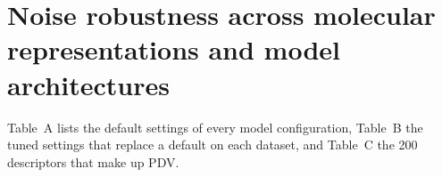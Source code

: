 \section{Noise robustness across molecular representations and model architectures}\label{app:add:robustness}

\label{app:noise:sec:hyperparameters_default}\label{app:noise:sec:hyperparameters_tuned}\label{app:noise:sec:pdv_descriptors}
Table~A lists the default settings of every model configuration, Table~B the tuned settings that replace a default on each dataset, and Table~C the 200 descriptors that make up PDV.




